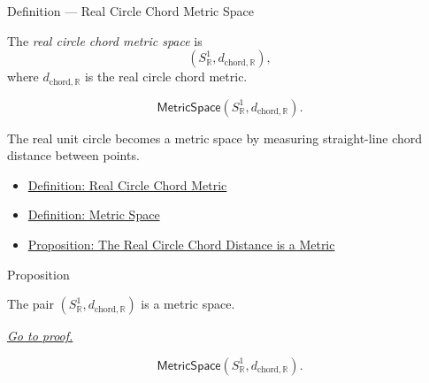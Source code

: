 \begin{definitionbox}{Definition --- Real Circle Chord Metric Space}
\begin{definition}
\label{def:real-circle-chord-metric-space}
The \emph{real circle chord metric space} is
\[
  (S^1_{\mathbb{R}},d_{\mathrm{chord},\mathbb{R}}),
\]
where \(d_{\mathrm{chord},\mathbb{R}}\) is the real circle chord metric.
\end{definition}
\end{definitionbox}

\begin{remark*}
\[
\mathsf{MetricSpace}(S^1_{\mathbb{R}},d_{\mathrm{chord},\mathbb{R}}).
\]
\end{remark*}

\begin{remark*}[Interpretation]
The real unit circle becomes a metric space by measuring straight-line chord
distance between points.
\end{remark*}

\begin{dependencies}
\begin{itemize}
  \item \hyperref[def:real-circle-chord-metric]{Definition: Real Circle Chord Metric}
  \item \hyperref[def:metric-space]{Definition: Metric Space}
  \item \hyperref[prop:real-circle-chord-metric]{Proposition: The Real Circle Chord Distance is a Metric}
\end{itemize}
\end{dependencies}

\begin{propositionbox}{Proposition}
\begin{proposition}
\label{prop:real-circle-chord-metric-space}
The pair \((S^1_{\mathbb{R}},d_{\mathrm{chord},\mathbb{R}})\) is a metric space.

\smallskip
\noindent
\hyperref[prf:real-circle-chord-metric-space]{\textit{Go to proof.}}
\end{proposition}
\end{propositionbox}

\begin{remark*}
\[
  \mathsf{MetricSpace}(S^1_{\mathbb{R}},d_{\mathrm{chord},\mathbb{R}}).
\]
\end{remark*}

